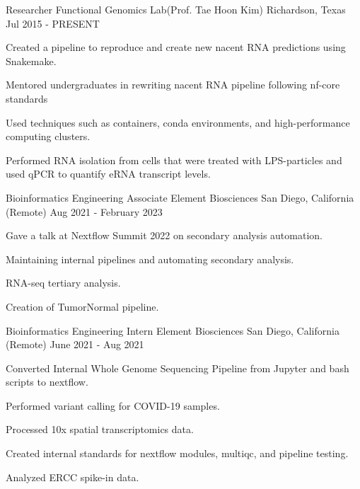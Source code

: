 

\begin{cventries}

	\cventry
	{Researcher} %
	{Functional Genomics Lab(Prof. Tae Hoon Kim)} %
	{Richardson, Texas} %
	{Jul 2015 - PRESENT} %
	{
		\begin{cvitems} %
			\item {Created a pipeline to reproduce and create new nacent RNA
			            predictions using Snakemake.}
			\item {Mentored undergraduates in rewriting nacent RNA pipeline following nf-core standards}
			\item {Used techniques such as containers, conda environments, and
			            high-performance computing clusters.}
			\item {Performed RNA isolation from cells that were treated with LPS-particles and used qPCR to quantify eRNA transcript levels.}
		\end{cvitems}
	}

	\cventry
	{Bioinformatics Engineering Associate} %
	{Element Biosciences} %
	{San Diego, California (Remote)} %
	{Aug 2021 - February 2023} %
	{
		\begin{cvitems} %
			\item {Gave a talk at Nextflow Summit 2022 on secondary analysis automation.}
			\item {Maintaining internal pipelines and automating secondary analysis.}
			\item {RNA-seq tertiary analysis.}
			\item {Creation of TumorNormal pipeline.}
		\end{cvitems}
	}

	\cventry
	{Bioinformatics Engineering Intern} %
	{Element Biosciences} %
	{San Diego, California (Remote)} %
	{June 2021 - Aug 2021} %
	{
		\begin{cvitems} %
			\item {Converted Internal Whole Genome Sequencing Pipeline from Jupyter and bash scripts to nextflow.}
			\item {Performed variant calling for COVID-19 samples.}
			\item {Processed 10x spatial transcriptomics data.}
			\item {Created internal standards for nextflow modules, multiqc, and pipeline testing.}
			\item {Analyzed ERCC spike-in data.}
		\end{cvitems}
	}


\end{cventries}
